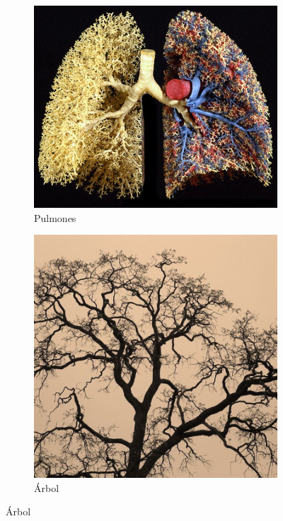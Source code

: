 \begin{frame}{\insertsectionhead}
\begin{figure}[ht!]
\begin{subfigure}[b]{0.3\textwidth}
      \includegraphics[width=\textwidth]{screenshots/lungs.jpg}
      \caption*{Pulmones}
    \end{subfigure}
    \hspace{\fill}
    \begin{subfigure}[b]{0.3\textwidth}
      \includegraphics[width=\textwidth]{screenshots/tree.jpg}
      \caption*{Árbol}
    \end{subfigure}
  \end{figure}
  
  \pause
  \vspace{\fill}

    
\end{frame}

